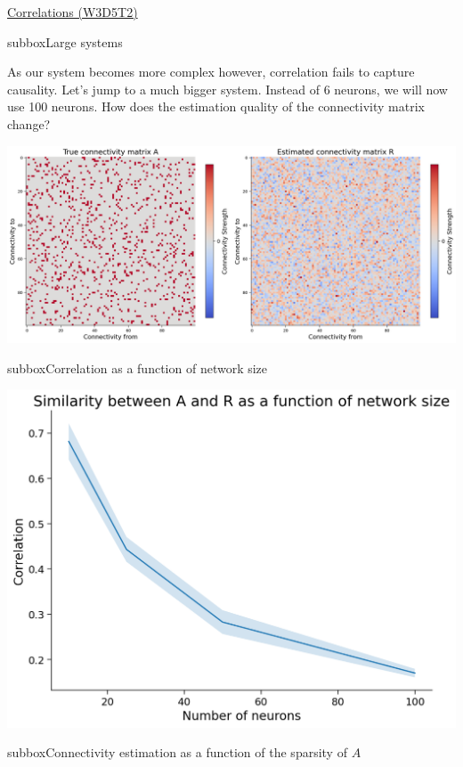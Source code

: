 \begin{textbox}{\href{https://compneuro.neuromatch.io/tutorials/W3D5_NetworkCausality/student/W3D5_Tutorial2.html}{Correlations (W3D5T2)}   }

\begin{subbox}{subbox}{Large systems}
\scriptsize

As our system becomes more complex however, correlation fails to capture causality.
Let's jump to a much bigger system. Instead of 6 neurons, we will now use 100 neurons. How does the estimation quality of the connectivity matrix change? 
\begin{center}

\includegraphics[scale=0.18]{Figures/NC/NC_Figure11.png}
\end{center}
\end{subbox}

\begin{subbox}{subbox}{Correlation as a function of network size}
\scriptsize
\begin{center}

\includegraphics[scale=0.15]{Figures/NC/NC_Figure13.png}
\end{center}
\end{subbox}
\begin{subbox}{subbox}{Connectivity estimation as a function of the sparsity of $A$}
\scriptsize


\end{subbox}
\end{textbox}
